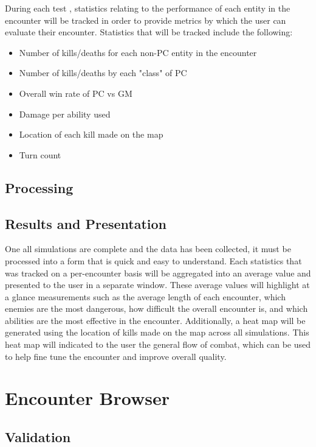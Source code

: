 \documentclass[12pt,a4paper]{report}
\begin{document}
		 During each test , statistics relating to the performance of each entity in the encounter will be tracked in order to provide metrics by which the user can evaluate their encounter. Statistics that will be tracked include the following:
		 
		\begin{itemize}
			\item Number of kills/deaths for each non-PC entity in the encounter
			\item Number of kills/deaths by each "class" of PC
			\item Overall win rate of PC vs GM
			\item Damage per ability used
			\item Location of each kill made on the map
			\item Turn count
		\end{itemize}
	
		\subsection{Processing}
		
		
		\subsection{Results and Presentation}
		One all simulations are complete and the data has been collected, it must be processed into a form that is quick and easy to understand. Each statistics that was tracked on a per-encounter basis will be aggregated into an average value and presented to the user in a separate window. These average values will highlight at a glance measurements such as the average length of each encounter, which enemies are the most dangerous, how difficult the overall encounter is, and which abilities are the most effective in the encounter. Additionally, a heat map will be generated using the location of kills made on the map across all simulations. This heat map will indicated to the user the general flow of combat, which can be used to help fine tune the encounter and improve overall quality. 
		
	\section{Encounter Browser}
		\subsection{Validation}
\end{document}
